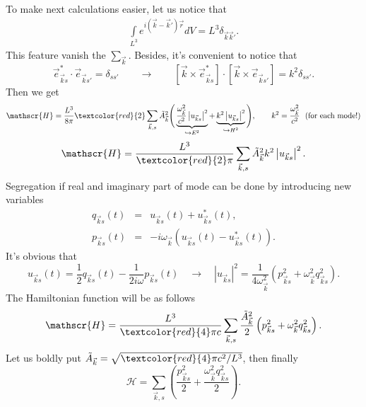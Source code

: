 	To make next calculations easier, let us notice that
	\begin{eqnarray}
		\int \limits_{L^3} e^{i (\vec{k} - \vec{k}')\vec{r}} dV = L^3 \delta_{\vec{k}\vec{k}'}.
	\end{eqnarray}
	This feature vanish the $\sum_{\vec{k}}$. Besides, it's convenient to notice that
	\begin{equation}
		\vec{e}_{\vec{k}s}^* \cdot \vec{e}_{\vec{k}s'} = \delta_{ss'} \qquad \to \qquad
		\left[ \vec{k} \times \vec{e}_{\vec{k}s}^* \right] \cdot \left[ \vec{k} \times \vec{e}_{\vec{k}s'} \right] = k^2 \delta_{ss'}.
	\end{equation}
	Then we get
	\begin{equation}
		\mathscr{H} = \frac{L^3}{8 \pi}\textcolor{red}{2} \sum_{\vec{k},s} \tilde{A}_{\vec{k}}^2 \Bigg( \underbrace{\frac{\omega_{\vec{k}}^2}{c^2} \left| u_{\vec{k}s} \right|^2}_{\hookrightarrow E^2} + \underbrace{k^2 \left| u_{\vec{k}s} \right|^2}_{\hookrightarrow H^2}  \Bigg), \qquad k^2 = \frac{\omega_{\vec{k}}^2}{c^2} \text{\ \ (for each mode!)}
	\end{equation}
	\begin{equation}
		\mathscr{H} = \frac{L^3}{\textcolor{red}{2} \pi} \sum_{\vec{k},s} \tilde{A}_{\vec{k}}^2 k^2 \left| u_{\vec{k}s} \right|^2.
	\end{equation}
	Segregation if real and imaginary part of mode can be done by introducing new variables
	\begin{eqnarray}
		q_{\vec{k}s}(t) &=& u_{\vec{k}s}(t) + u^*_{\vec{k}s}(t) , \\
		p_{\vec{k}s}(t) &=& -i \omega_{\vec{k}}  \left( u_{\vec{k}s}(t) - u^*_{\vec{k}s}(t) \right).
	\end{eqnarray}
	It's obvious that
	\begin{equation}
		u_{\vec{k}s}(t) = \frac{1}{2} q_{\vec{k}s}(t) - \frac{1}{2 i \omega} p_{\vec{k}s}(t) \quad \to \quad \left| u_{\vec{k}s} \right|^2 = \frac{1}{4 \omega_{\vec{k}}^2} \left( p^2_{\vec{k}s} + \omega^2_{\vec{k}} q_{\vec{k}s}^2 \right).
	\end{equation}
	The Hamiltonian function will be as follows
	\begin{equation}
		\mathscr{H} = \frac{L^3}{\textcolor{red}{4} \pi c} \sum_{\vec{k},s} \frac{\tilde{A}_{\vec{k}}^2}{2} \left( p^2_{\vec{k}s} + \omega^2_{\vec{k}} q_{\vec{k}s}^2 \right).
	\end{equation}
	Let us boldly put $\tilde{A}_{\vec{k}} = \sqrt{\textcolor{red}{4} \pi c^2/L^3}$, then finally
	\begin{equation}
		\mathscr{H} = \sum_{\vec{k},s}  \left( \frac{p^2_{\vec{k}s}}{2}+ \frac{\omega^2_{\vec{k}} q_{\vec{k}s}^2}{2} \right).
	\end{equation}
	